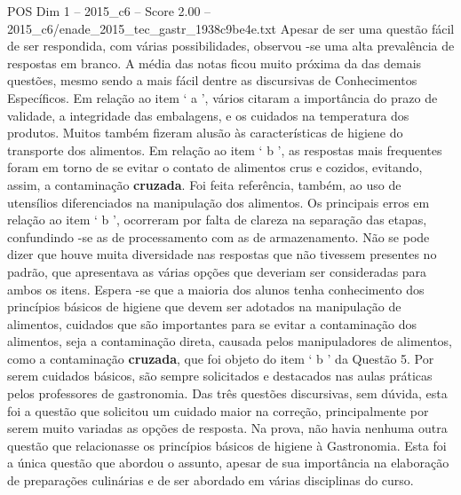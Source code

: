 \begin{textsample}{POS Dim 1 – 2015\_c6 – Score 2.00 – 2015\_c6/enade\_2015\_tec\_gastr\_1938c9be4e.txt}
Apesar de ser uma questão fácil de ser respondida, com várias possibilidades, observou -se uma alta prevalência de respostas em branco.
A média das notas ficou muito próxima da das demais questões, mesmo sendo a mais fácil dentre as discursivas de Conhecimentos Específicos.
Em relação ao item ‘ a ’, vários citaram a importância do prazo de validade, a integridade das embalagens, e os cuidados na temperatura dos produtos.
Muitos também fizeram alusão às características de higiene do transporte dos alimentos.
Em relação ao item ‘ b ’, as respostas mais frequentes foram em torno de se evitar o contato de alimentos crus e cozidos, evitando, assim, a contaminação \textbf{cruzada}.
Foi feita referência, também, ao uso de utensílios diferenciados na manipulação dos alimentos.
Os principais erros em relação ao item ‘ b ’, ocorreram por falta de clareza na separação das etapas, confundindo -se as de processamento com as de armazenamento.
Não se pode dizer que houve muita diversidade nas respostas que não tivessem presentes no padrão, que apresentava as várias opções que deveriam ser consideradas para ambos os itens.
Espera -se que a maioria dos alunos tenha conhecimento dos princípios básicos de higiene que devem ser adotados na manipulação de alimentos, cuidados que são importantes para se evitar a contaminação dos alimentos, seja a contaminação direta, causada pelos manipuladores de alimentos, como a contaminação \textbf{cruzada}, que foi objeto do item ‘ b ’ da Questão 5.
Por serem cuidados básicos, são sempre solicitados e destacados nas aulas práticas pelos professores de gastronomia.
Das três questões discursivas, sem dúvida, esta foi a questão que solicitou um cuidado maior na correção, principalmente por serem muito variadas as opções de resposta.
Na prova, não havia nenhuma outra questão que relacionasse os princípios básicos de higiene à Gastronomia.
Esta foi a única questão que abordou o assunto, apesar de sua importância na elaboração de preparações culinárias e de ser abordado em várias disciplinas do curso.

\end{textsample}
